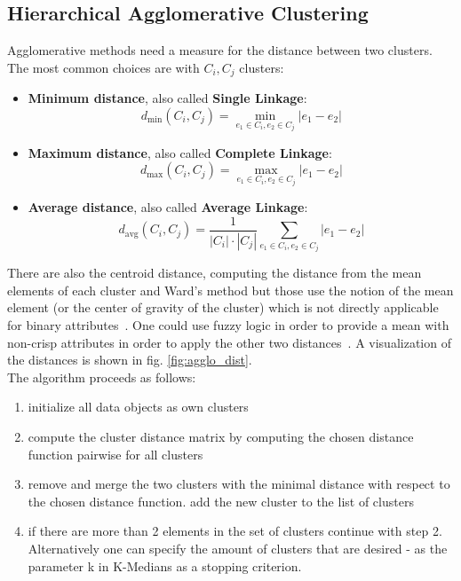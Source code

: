 \subsection{Hierarchical Agglomerative Clustering}\label{\positionnumber}
Agglomerative methods need a measure for the distance between two clusters. The most common choices are with $C_i, C_j$ clusters:
\begin{itemize}
    \item \textbf{Minimum distance}, also called \textbf{Single Linkage}: 
    \[d_{\text{min}}(C_i, C_j) = \min_{e_1 \in C_i, e_2 \in C_j} |e_1 - e_2|\]
    \item \textbf{Maximum distance}, also called \textbf{Complete Linkage}: 
    \[d_{\text{max}}(C_i, C_j) = \max_{e_1 \in C_i, e_2 \in C_j} |e_1 - e_2|\]
    \item \textbf{Average distance}, also called \textbf{Average Linkage}: 
    \[d_{\text{avg}}(C_i, C_j) = \frac{1}{|C_i| \cdot |C_j|} \sum_{e_1 \in C_i, e_2 \in C_j} |e_1 - e_2|\]
\end{itemize}
There are also the centroid distance, computing the distance from the mean elements of each cluster and Ward's method but those use the notion of the mean element (or the center of gravity of the cluster) which is not directly applicable for binary attributes~\cite{mirkin2013mathematical, han2011data}. One could use fuzzy logic in order to provide a mean with non-crisp attributes in order to apply the other two distances~\cite{kruse2016computational}. A visualization of the distances is shown in fig. \ref{fig:agglo_dist}.
 \\
The algorithm proceeds as follows: 
\begin{enumerate}
    \item initialize all data objects as own clusters
    \item compute the cluster distance matrix by computing the chosen distance function pairwise for all clusters
    \item remove and merge the two clusters with the minimal distance with respect to the chosen distance function. add the new cluster to the list of clusters
    \item if there are more than 2 elements in the set of clusters continue with step 2. Alternatively one can specify the amount of clusters that are desired - as the parameter k in K-Medians as a stopping criterion. 
\end{enumerate}


